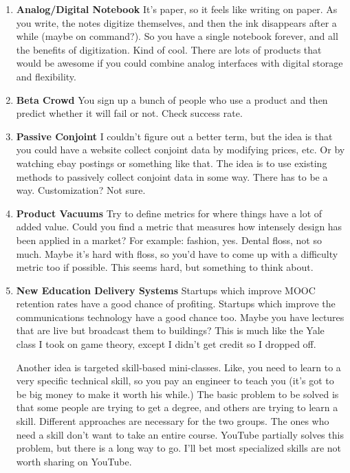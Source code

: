 \documentclass[paper=a4, fontsize=11pt]{scrartcl} %
\numberwithin{equation}{section} %
\numberwithin{figure}{section} %
\numberwithin{table}{section} %
\begin{document}
\begin{enumerate}
\item \textbf{Analog/Digital Notebook} It's paper, so it feels like writing on paper.  As you write, the notes digitize themselves, and then the ink disappears after a while (maybe on command?).  So you have a single notebook forever, and all the benefits of digitization.  Kind of cool.  There are lots of products that would be awesome if you could combine analog interfaces with digital storage and flexibility.  

\item \textbf{Beta Crowd} You sign up a bunch of people who use a product and then predict whether it will fail or not.  Check success rate.

\item \textbf{Passive Conjoint} I couldn't figure out a better term, but the idea is that you could have a website collect conjoint data by modifying prices, etc.  Or by watching ebay postings or something like that.  The idea is to use existing methods to passively collect conjoint data in some way.  There has to be a way.  Customization?  Not sure.

\item \textbf{Product Vacuums}  Try to define metrics for where things have a lot of added value.  Could you find a metric that measures how intensely design has been applied in a market?  For example: fashion, yes.  Dental floss, not so much.  Maybe it's hard with floss, so you'd have to come up with a difficulty metric too if possible.  This seems hard, but something to think about.

\item \textbf{New Education Delivery Systems}  Startups which improve MOOC retention rates have a good chance of profiting.  Startups which improve the communications technology have a good chance too.  Maybe you have lectures that are live but broadcast them to buildings?  This is much like the Yale class I took on game theory, except I didn't get credit so I dropped off.  

Another idea is targeted skill-based mini-classes.  Like, you need to learn to a very specific technical skill, so you pay an engineer to teach you (it's got to be big money to make it worth his while.)  The basic problem to be solved is that some people are trying to get a degree, and others are trying to learn a skill.  Different approaches are necessary for the two groups.  The ones who need a skill don't want to take an entire course.  YouTube partially solves this problem, but there is a long way to go.  I'll bet most specialized skills are not worth sharing on YouTube.


\end{enumerate}
\end{document}
